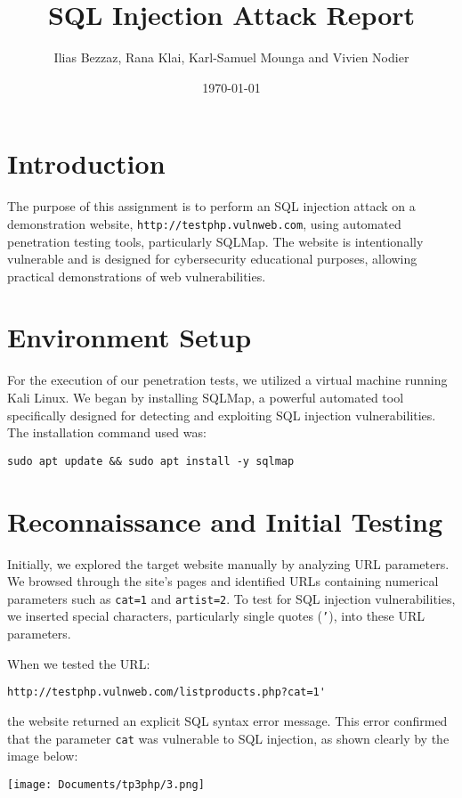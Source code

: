 \documentclass{article}
\title{SQL Injection Attack Report}
\author{Ilias Bezzaz, Rana Klai, Karl-Samuel Mounga and Vivien Nodier}
\date{\today}
\begin{document}
\maketitle

\section{Introduction}
The purpose of this assignment is to perform an SQL injection attack on a demonstration website, \texttt{http://testphp.vulnweb.com}, using automated penetration testing tools, particularly SQLMap. The website is intentionally vulnerable and is designed for cybersecurity educational purposes, allowing practical demonstrations of web vulnerabilities.

\section{Environment Setup}
For the execution of our penetration tests, we utilized a virtual machine running Kali Linux. We began by installing SQLMap, a powerful automated tool specifically designed for detecting and exploiting SQL injection vulnerabilities. The installation command used was:
\begin{lstlisting}
sudo apt update && sudo apt install -y sqlmap
\end{lstlisting}

\section{Reconnaissance and Initial Testing}
Initially, we explored the target website manually by analyzing URL parameters. We browsed through the site's pages and identified URLs containing numerical parameters such as \texttt{cat=1} and \texttt{artist=2}. To test for SQL injection vulnerabilities, we inserted special characters, particularly single quotes (\texttt{'}), into these URL parameters. 

When we tested the URL:
\begin{lstlisting}
http://testphp.vulnweb.com/listproducts.php?cat=1'
\end{lstlisting}

the website returned an explicit SQL syntax error message. This error confirmed that the parameter \texttt{cat} was vulnerable to SQL injection, as shown clearly by the image below:

\texttt{[image: Documents/tp3php/3.png]}
\end{document}
